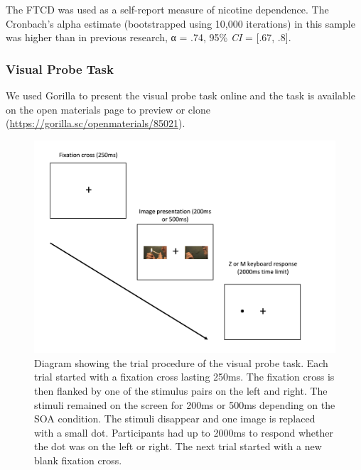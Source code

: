 \documentclass[empirical, authordate, issue]{jote-new-article}
\begin{document}
The FTCD \parencite{Fagerström2012, Heatherton1991} was used as a self-report measure of nicotine dependence. The Cronbach's alpha estimate (bootstrapped using 10,000 iterations) in this sample was higher than in previous research, α = .74, 95\% \emph{CI} = [.67, .8].





\subsubsection{Visual Probe Task}

We used Gorilla \parencite{AnwylIrvine2019} to present the visual probe task online and the task is available on the open materials page to preview or clone (\url{https://gorilla.sc/openmaterials/85021}).
\begin{figure}[h!]

  \begin{fullwidth}
    \includegraphics[width=\linewidth]{media/image1.jpeg}
    \caption{Diagram showing the trial procedure of the visual probe task. Each trial started with a fixation cross lasting 250ms. The fixation cross is then flanked by one of the stimulus pairs on the left and right. The stimuli remained on the screen for 200ms or 500ms depending on the SOA condition. The stimuli disappear and one image is replaced with a small dot. Participants had up to 2000ms to respond whether the dot was on the left or right. The next trial started with a new blank fixation cross.
    }

    \label{fig:1}
  \end{fullwidth}


\end{figure}
\end{document}
